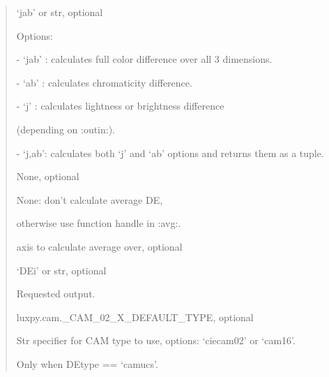 \documentclass[letterpaper,10pt,english]{sphinxmanual}
\begin{document}
\begin{fulllineitems}
\begin{description}
\begin{quote}
\begin{description}
\item[{DEtype}] \leavevmode
\begin{DUlineblock}{0em}
\item[] ‘jab’ or str, optional
\item[] Options: 
\item[]
\begin{DUlineblock}{\DUlineblockindent}
\item[] - ‘jab’ : calculates full color difference over all 3 dimensions.
\item[] - ‘ab’  : calculates chromaticity difference.
\item[] - ‘j’   : calculates lightness or brightness difference 
\item[]
\begin{DUlineblock}{\DUlineblockindent}
\item[] (depending on :outin:).
\end{DUlineblock}
\item[] - ‘j,ab’: calculates both ‘j’ and ‘ab’ options 
and returns them as a tuple.
\end{DUlineblock}
\end{DUlineblock}

\item[{avg}] \leavevmode
\begin{DUlineblock}{0em}
\item[] None, optional
\item[] None: don’t calculate average DE, 
\item[]
\begin{DUlineblock}{\DUlineblockindent}
\item[] otherwise use function handle in :avg:.
\end{DUlineblock}
\end{DUlineblock}

\item[{avg\_axis}] \leavevmode
\begin{DUlineblock}{0em}
\item[] axis to calculate average over, optional
\end{DUlineblock}

\item[{out}] \leavevmode
\begin{DUlineblock}{0em}
\item[] ‘DEi’ or str, optional
\item[] Requested output.
\end{DUlineblock}

\item[{camtype}] \leavevmode
\begin{DUlineblock}{0em}
\item[] luxpy.cam.\_CAM\_02\_X\_DEFAULT\_TYPE, optional
\item[] Str specifier for CAM type to use, options: ‘ciecam02’ or ‘cam16’.
\item[] Only when DEtype == ‘camucs’.
\end{DUlineblock}


\end{description}
\end{quote}
\end{description}
\end{fulllineitems}
\end{document}
